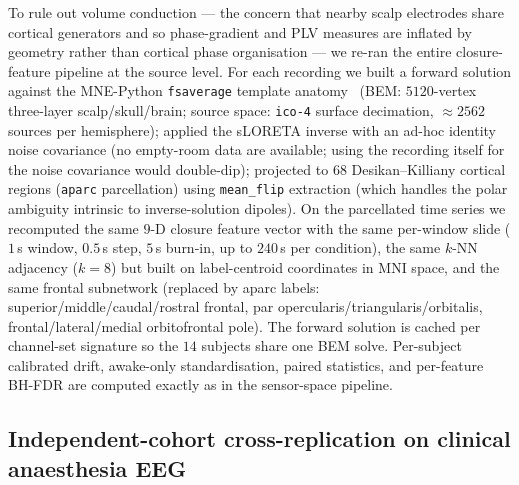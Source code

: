 \documentclass[11pt,a4paper]{article}
\begin{document}
To rule out volume conduction --- the concern that nearby scalp electrodes share cortical generators and so phase-gradient and PLV measures are inflated by geometry rather than cortical phase organisation --- we re-ran the entire closure-feature pipeline at the source level. For each recording we built a forward solution against the MNE-Python \texttt{fsaverage} template anatomy~\cite{gramfort2014mne} (BEM: $5120$-vertex three-layer scalp/skull/brain; source space: \texttt{ico-4} surface decimation, $\approx\!2562$ sources per hemisphere); applied the sLORETA inverse with an ad-hoc identity noise covariance (no empty-room data are available; using the recording itself for the noise covariance would double-dip); projected to $68$ Desikan--Killiany cortical regions (\texttt{aparc} parcellation) using \texttt{mean\_flip} extraction (which handles the polar ambiguity intrinsic to inverse-solution dipoles). On the parcellated time series we recomputed the same $9$-D closure feature vector with the same per-window slide ($1$\,s window, $0.5$\,s step, $5$\,s burn-in, up to $240$\,s per condition), the same $k$-NN adjacency ($k=8$) but built on label-centroid coordinates in MNI space, and the same frontal subnetwork (replaced by aparc labels: superior/middle/caudal/rostral frontal, par opercularis/triangularis/orbitalis, frontal/lateral/medial orbitofrontal pole). The forward solution is cached per channel-set signature so the $14$ subjects share one BEM solve. Per-subject calibrated drift, awake-only standardisation, paired statistics, and per-feature BH-FDR are computed exactly as in the sensor-space pipeline.

\subsection{Independent-cohort cross-replication on clinical anaesthesia EEG}\label{sec:clinical-methods}
\end{document}

